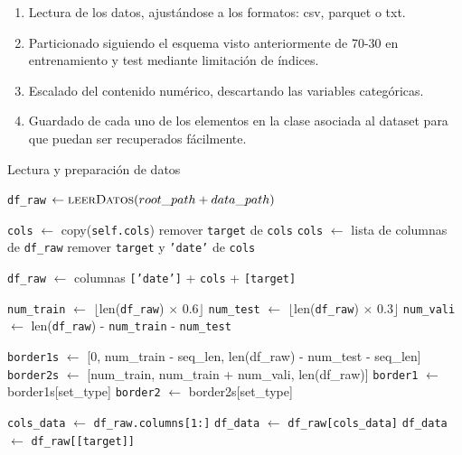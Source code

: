 \begin{enumerate}
	\item Lectura de los datos, ajustándose a los formatos: csv, parquet o txt.
	\item Particionado siguiendo el esquema visto anteriormente de 70-30 en entrenamiento y test mediante limitación de índices.
	\item Escalado del contenido numérico, descartando las variables categóricas.
	\item Guardado de cada uno de los elementos en la clase asociada al dataset para que puedan ser recuperados fácilmente.
\end{enumerate}

\begin{algorithm}[H]
	\caption{Lectura y preparación de datos}
	\begin{algorithmic}[1]
		
		\State \texttt{df\_raw} $\gets \Call{leerDatos}{root\_path + data\_path}$ 
		
		\State \texttt{cols} $\gets$ copy(\texttt{self.cols})
		\State remover \texttt{target} de \texttt{cols}
		\Else
		\State \texttt{cols} $\gets$ lista de columnas de \texttt{df\_raw}
		\State remover \texttt{target} y \texttt{'date'} de \texttt{cols}
		\EndIf
		
		\State \texttt{df\_raw} $\gets$ columnas \texttt{['date']} + \texttt{cols} + \texttt{[target]}
		
		\State \texttt{num\_train} $\gets$ $\lfloor$len(\texttt{df\_raw}) $\times$ 0.6$\rfloor$
		\State \texttt{num\_test} $\gets$ $\lfloor$len(\texttt{df\_raw}) $\times$ 0.3$\rfloor$
		\State \texttt{num\_vali} $\gets$ len(\texttt{df\_raw}) - \texttt{num\_train} - \texttt{num\_test}
		
		\State \texttt{border1s} $\gets$ [0, num\_train - seq\_len, len(df\_raw) - num\_test - seq\_len]
		\State \texttt{border2s} $\gets$ [num\_train, num\_train + num\_vali, len(df\_raw)]
		\State \texttt{border1} $\gets$ border1s[set\_type]
		\State \texttt{border2} $\gets$ border2s[set\_type]
		
		
		\State \texttt{cols\_data} $\gets$ \texttt{df\_raw.columns[1:]}
		\State \texttt{df\_data} $\gets$ \texttt{df\_raw[cols\_data]}
		\State \texttt{df\_data} $\gets$ \texttt{df\_raw[[target]]}
		\EndIf
		

\end{algorithmic}
\end{algorithm}
